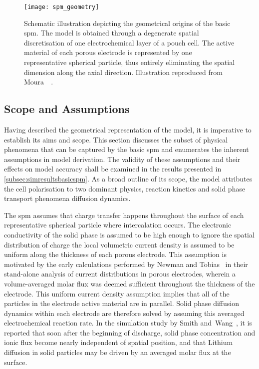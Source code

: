 \begin{figure}[!htbp]
    \centering
    \texttt{[image: spm\_geometry]}
    \caption[Schematic illustration depicting geometrical origins of the
    ]
    {%
        Schematic illustration depicting the geometrical origins of the basic
        \gls{spm}. The model is obtained through a degenerate spatial
        discretisation of one electrochemical layer of a  pouch cell.  The
        active material of each porous electrode is represented by one
        representative spherical particle, thus entirely eliminating the spatial
        dimension along the axial direction. Illustration reproduced
        from Moura~\etal~\cite{Moura2012}.
    }%
    \label{fig:sandwichtospm}
\end{figure}

\subsection{Scope and Assumptions}\label{subsec:basicspmassumptions}

Having described the  geometrical representation of the model,  it is imperative
to establish its  aims and scope. This section discusses  the subset of physical
phenomena  that can  be  captured  by the  basic  \gls{spm}  and enumerates  the
inherent assumptions in model derivation.  The validity of these assumptions and
their effects  on model accuracy shall  be examined in the  results presented in
\cref{subsec:simresultsbasicspm}. As  a broad  outline of  its scope,  the model
attributes  the  cell polarisation  to  two  dominant physics,  \viz{}  reaction
kinetics and solid phase transport phenomena \ie{} diffusion dynamics.


The  \gls{spm}  assumes that  charge  transfer  happens throughout  the  surface
of  each  representative  spherical  particle where  intercalation  occurs.  The
electronic  conductivity of  the solid  phase is  assumed to  be high  enough to
ignore the  spatial distribution  of charge \ie{}  the local  volumetric current
density is assumed  to be uniform along the thickness  of each porous electrode.
This assumption is  motivated by the early calculations performed  by Newman and
Tobias~\cite{Newman1962} in their stand-alone  analysis of current distributions
in porous electrodes, wherein a volume-averaged molar flux was deemed sufficient
throughout  the  thickness  of  the  electrode.  This  uniform  current  density
assumption implies  that all of the  particles in the electrode  active material
are  in parallel.  Solid  phase  diffusion dynamics  within  each electrode  are
therefore solved by assuming this averaged electrochemical reaction rate. In the
simulation study  by Smith and~Wang~\cite{Smith2006},  it is reported  that soon
after  the beginning  of discharge,  solid  phase concentration  and ionic  flux
become nearly  independent of  spatial position, and  that Lithium  diffusion in
solid particles may be driven by an averaged molar flux at the surface.


